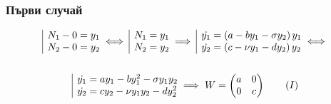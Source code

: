 \documentclass[a4paper,fleqn,12pt]{article}
\begin{document}
\subsubsection{Първи случай}
\begin{gather*}
	\begin{array}{|l@{}}
		 N_1 - 0 = y_1\\
		 N_2 - 0 = y_2
	\end{array} \iff 
	\begin{array}{|l@{}}
		 N_1 = y_1\\
		 N_2 = y_2
	\end{array} \implies
	\begin{array}{|l@{}}
		\dot{y_1} = \left(a - by_1 - \sigma y_2 \right) y_1\\
		\dot{y_2} = \left(c - \nu y_1 - d y_2 \right) y_2 
	\end{array} \iff \\ \\
	\begin{array}{|l@{}}
		\dot{y_1} = ay_1 - by_1 ^2- \sigma y_1 y_2 \\
		\dot{y_2} = cy_2 - \nu y_1y_2 - d y_2 ^2 
	\end{array} 
\implies  W = \begin{pmatrix} a&0\\0&c \end{pmatrix} \tag{$I$}
\end{gather*}
\end{document}
